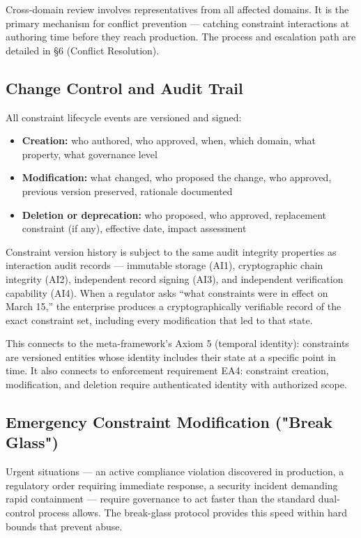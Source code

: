Cross-domain review involves representatives from all affected domains. It is the primary mechanism for conflict prevention --- catching constraint interactions at authoring time before they reach production. The process and escalation path are detailed in \S{}6 (Conflict Resolution).

\subsection{Change Control and Audit Trail}


All constraint lifecycle events are versioned and signed:

\begin{itemize}
  \item \textbf{Creation:} who authored, who approved, when, which domain, what property, what governance level
  \item \textbf{Modification:} what changed, who proposed the change, who approved, previous version preserved, rationale documented
  \item \textbf{Deletion or deprecation:} who proposed, who approved, replacement constraint (if any), effective date, impact assessment
\end{itemize}


Constraint version history is subject to the same audit integrity properties as interaction audit records --- immutable storage (AI1), cryptographic chain integrity (AI2), independent record signing (AI3), and independent verification capability (AI4). When a regulator asks ``what constraints were in effect on March 15,'' the enterprise produces a cryptographically verifiable record of the exact constraint set, including every modification that led to that state.

This connects to the meta-framework's Axiom 5 (temporal identity): constraints are versioned entities whose identity includes their state at a specific point in time. It also connects to enforcement requirement EA4: constraint creation, modification, and deletion require authenticated identity with authorized scope.

\subsection{Emergency Constraint Modification ("Break Glass")}


Urgent situations --- an active compliance violation discovered in production, a regulatory order requiring immediate response, a security incident demanding rapid containment --- require governance to act faster than the standard dual-control process allows. The break-glass protocol provides this speed within hard bounds that prevent abuse.

